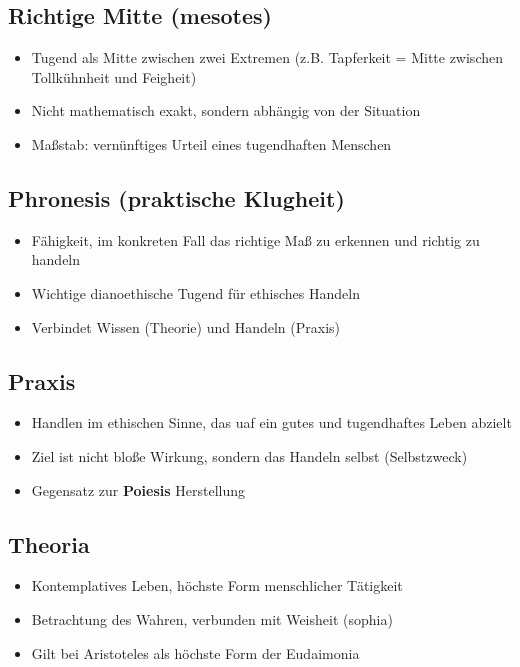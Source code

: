 \subsection{Richtige Mitte (mesotes)}
\begin{itemize}
    \item Tugend als Mitte zwischen zwei Extremen (z.B. Tapferkeit = Mitte zwischen Tollkühnheit und Feigheit)
    \item Nicht mathematisch exakt, sondern abhängig von der Situation
    \item Maßstab: vernünftiges Urteil eines tugendhaften Menschen
\end{itemize}

\subsection{Phronesis (praktische Klugheit)}
\begin{itemize}
    \item Fähigkeit, im konkreten Fall das richtige Maß zu erkennen und richtig zu handeln
    \item Wichtige dianoethische Tugend für ethisches Handeln
    \item Verbindet Wissen (Theorie) und Handeln (Praxis)
\end{itemize}

\subsection{Praxis}
\begin{itemize}
    \item Handlen im ethischen Sinne, das uaf ein gutes und tugendhaftes Leben abzielt
    \item Ziel ist nicht bloße Wirkung, sondern das Handeln selbst (Selbstzweck)
    \item Gegensatz zur \textbf{Poiesis} Herstellung
\end{itemize}

\subsection{Theoria}
\begin{itemize}
    \item Kontemplatives Leben, höchste Form menschlicher Tätigkeit
    \item Betrachtung des Wahren, verbunden mit Weisheit (sophia)
    \item Gilt bei Aristoteles als höchste Form der Eudaimonia
\end{itemize}

